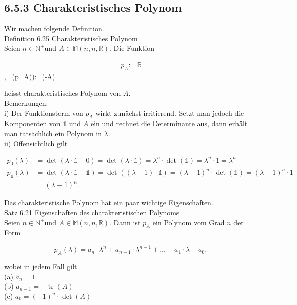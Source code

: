 \documentclass[10pt]{article}
\begin{document}
\subsection*{6.5.3 Charakteristisches Polynom}
Wir machen folgende Definition.\\
Definition 6.25 Charakteristisches Polynom\\
Seien $n \in \mathbb{N}^{+}$und $A \in \mathbb{M}(n, n, \mathbb{R})$. Die Funktion


\begin{align*}
p_{A}: & \mathbb{R}
\end{align*} \rightarrow {}, ~\left(\lambda \mapsto p_{A}(\lambda):=(\lambda \cdot {}-A)\right.


heisst charakteristisches Polynom von $A$.\\
Bemerkungen:\\
i) Der Funktionsterm von $p_{A}$ wirkt zunächst irritierend. Setzt man jedoch die Komponenten von $\mathbb{1}$ und $A$ ein und rechnet die Determinante aus, dann erhält man tatsächlich ein Polynom in $\lambda$.\\
ii) Offensichtlich gilt


\begin{align*}
p_{0}(\lambda) & =\operatorname{det}(\lambda \cdot \mathbb{1}-0)=\operatorname{det}(\lambda \cdot \mathbb{1})=\lambda^{n} \cdot \operatorname{det}(\mathbb{1})=\lambda^{n} \cdot 1=\lambda^{n}  \tag{6.157}\\
p_{\mathbb{1}}(\lambda) & =\operatorname{det}(\lambda \cdot \mathbb{1}-\mathbb{1})=\operatorname{det}((\lambda-1) \cdot \mathbb{1})=(\lambda-1)^{n} \cdot \operatorname{det}(\mathbb{1})=(\lambda-1)^{n} \cdot 1 \\
& =(\lambda-1)^{n} . \tag{6.158}
\end{align*}


Das charakteristische Polynom hat ein paar wichtige Eigenschaften.\\
Satz 6.21 Eigenschaften des charakteristischen Polynoms\\
Seien $n \in \mathbb{N}^{+}$und $A \in \mathbb{M}(n, n, \mathbb{R})$. Dann ist $p_{A}$ ein Polynom vom Grad $n$ der Form


\begin{equation*}
p_{A}(\lambda)=a_{n} \cdot \lambda^{n}+a_{n-1} \cdot \lambda^{n-1}+\ldots+a_{1} \cdot \lambda+a_{0}, \tag{6.159}
\end{equation*}


wobei in jedem Fall gilt\\
(a) $a_{n}=1$\\
(b) $a_{n-1}=-\operatorname{tr}(A)$\\
(c) $a_{0}=(-1)^{n} \cdot \operatorname{det}(A)$
\end{document}
